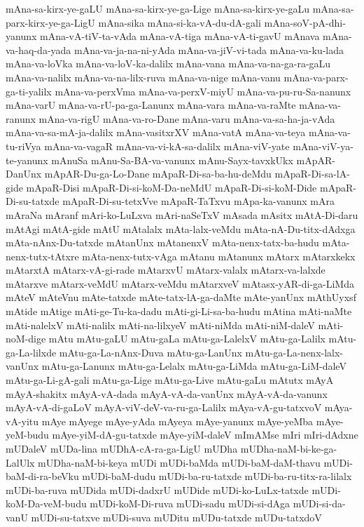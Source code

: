 {mAna-sa-kirx-ye-gaLU
mAna-sa-kirx-ye-ga-Lige
mAna-sa-kirx-ye-gaLu
mAna-sa-parx-kirx-ye-ga-LigU
mAna-sika
mAna-si-ka-vA-du-dA-gali
mAna-soV-pA-dhi-yanunx
mAna-vA-tiV-ta-vAda
mAna-vA-tiga
mAna-vA-ti-gavU
mAnava
mAna-va-haq-da-yada
mAna-va-ja-na-ni-yAda
mAna-va-jiV-vi-tada
mAna-va-ku-lada
mAna-va-loVka
mAna-va-loV-ka-dalilx
mAna-vana
mAna-va-na-ga-ra-gaLu
mAna-va-nalilx
mAna-va-na-lilx-ruva
mAna-va-nige
mAna-vanu
mAna-va-parx-ga-ti-yalilx
mAna-va-perxVma
mAna-va-perxV-miyU
mAna-va-pu-ru-Sa-nanunx
mAna-varU
mAna-va-rU-pa-ga-Lanunx
mAna-vara
mAna-va-raMte
mAna-va-ranunx
mAna-va-rigU
mAna-va-ro-Dane
mAna-varu
mAna-va-sa-ha-ja-vAda
mAna-va-sa-mA-ja-dalilx
mAna-vasitxrXV
mAna-vatA
mAna-va-teya
mAna-va-tu-riVya
mAna-va-vagaR
mAna-va-vi-kA-sa-dalilx
mAna-viV-yate
mAna-viV-ya-te-yanunx
mAnuSa
mAnu-Sa-BA-va-vanunx
mAnu-Sayx-tavxkUkx
mApAR-DanUnx
mApAR-Du-ga-Lo-Dane
mApaR-Di-sa-ba-hu-deMdu
mApaR-Di-sa-lA-gide
mApaR-Disi
mApaR-Di-si-koM-Da-neMdU
mApaR-Di-si-koM-Dide
mApaR-Di-su-tatxde
mApaR-Di-su-tetxVve
mApaR-TaTxvu
mApa-ka-vanunx
mAra
mAraNa
mAranf
mAri-ko-LuLxva
mAri-naSeTxV
mAsada
mAsitx
mAtA-Di-daru
mAtAgi
mAtA-gide
mAtU
mAtalalx
mAta-lalx-veMdu
mAta-nA-Du-titx-dAdxga
mAta-nAnx-Du-tatxde
mAtanUnx
mAtanenxV
mAta-nenx-tatx-ba-hudu
mAta-nenx-tutx-tAtxre
mAta-nenx-tutx-vAga
mAtanu
mAtanunx
mAtarx
mAtarxkekx
mAtarxtA
mAtarx-vA-gi-rade
mAtarxvU
mAtarx-valalx
mAtarx-va-lalxde
mAtarxve
mAtarx-veMdU
mAtarx-veMdu
mAtarxveV
mAtasx-yAR-di-ga-LiMda
mAteV
mAteVnu
mAte-tatxde
mAte-tatx-lA-ga-daMte
mAte-yanUnx
mAthUyxsf
mAtide
mAtige
mAti-ge-Tu-ka-dadu
mAti-gi-Li-sa-ba-hudu
mAtina
mAti-naMte
mAti-nalelxV
mAti-nalilx
mAti-na-lilxyeV
mAti-niMda
mAti-niM-daleV
mAti-noM-dige
mAtu
mAtu-gaLU
mAtu-gaLa
mAtu-ga-LalelxV
mAtu-ga-Lalilx
mAtu-ga-La-lilxde
mAtu-ga-La-nAnx-Duva
mAtu-ga-LanUnx
mAtu-ga-La-nenx-lalx-vanUnx
mAtu-ga-Lanunx
mAtu-ga-Lelalx
mAtu-ga-LiMda
mAtu-ga-LiM-daleV
mAtu-ga-Li-gA-gali
mAtu-ga-Lige
mAtu-ga-Live
mAtu-gaLu
mAtutx
mAyA
mAyA-shakitx
mAyA-vA-dada
mAyA-vA-da-vanUnx
mAyA-vA-da-vanunx
mAyA-vA-di-gaLoV
mAyA-viV-deV-va-ru-ga-Lalilx
mAya-vA-gu-tatxvoV
mAya-vA-yitu
mAye
mAyege
mAye-yAda
mAyeya
mAye-yanunx
mAye-yeMba
mAye-yeM-budu
mAye-yiM-dA-gu-tatxde
mAye-yiM-daleV
mImAMse
mIri
mIri-dAdxne
mUDaleV
mUDa-lina
mUDhA-cA-ra-ga-LigU
mUDha
mUDha-naM-bi-ke-ga-LalUlx
mUDha-naM-bi-keya
mUDi
mUDi-baMda
mUDi-baM-daM-thavu
mUDi-baM-di-ra-beVku
mUDi-baM-dudu
mUDi-ba-ru-tatxde
mUDi-ba-ru-titx-ra-lilalx
mUDi-ba-ruva
mUDida
mUDi-dadxrU
mUDide
mUDi-ko-LuLx-tatxde
mUDi-koM-Da-veM-budu
mUDi-koM-Di-ruva
mUDi-sadu
mUDi-si-dAga
mUDi-si-da-vanU
mUDi-su-tatxve
mUDi-suva
mUDitu
mUDu-tatxde
mUDu-tatxdoV
}
